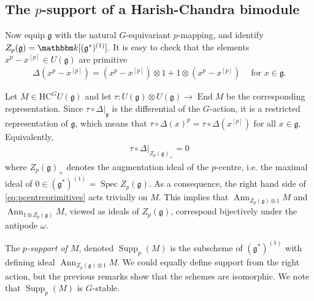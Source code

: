 \documentclass[twoside,12pt,reqno]{amsart}
\theoremstyle{remark}
\numberwithin{equation}{section}
\def\k{{\mathbbm k}}
\def\Ann{\operatorname{Ann}}
\def\Spec{\operatorname{Spec}}
\def\End{\operatorname{End}}
\def\Supp{\operatorname{Supp}}
\def\HC{\mathrm{HC}}
\def\g{{\mathfrak g}}
\begin{document}
\subsection{The $p$-support of a Harish-Chandra bimodule} 
\label{ss:psuppHCbimods}

Now equip $\g$ with the natural $G$-equivariant $p$-mapping, and identify $Z_p(\g) = \k[(\g^*)^{(1)}]$. It is easy to check that the elements $x^p - x^{[p]} \in U(\g)$ are primitive
\begin{eqnarray}
    \label{eq:pcentreprimitives}
    \Delta(x^p - x^{[p]}) = (x^p - x^{[p]}) \otimes 1 + 1\otimes (x^p - x^{[p]}) \ \ \ \ \text{ for } x\in \g.
\end{eqnarray}

Let $M \in \HC^G U(\g)$ and let $\tau : U(\g) \otimes U(\g) \to \End M$ be the corresponding representation. Since $\tau \circ \Delta|_\g$ is the differential of the $G$-action, it is a restricted representation of $\g$, which means that $\tau \circ \Delta(x)^p = \tau \circ\Delta(x^{[p]})$ for all $x\in \g$. Equivalently,
\begin{eqnarray}
    \label{eq:leftequalsrightpchar}
\tau \circ \Delta|_{Z_p(\g)_+} = 0    
\end{eqnarray}
where $Z_p(\g)_+$ denotes the augmentation ideal of the $p$-centre, i.e. the maximal ideal of $0 \in (\g^*)^{(1)} = \Spec Z_p(\g)$. As a consequence, the right hand side of \eqref{eq:pcentreprimitives} acts trivially on $M$. This implies that $\Ann_{Z_p(\g) \otimes 1} M$ and $\Ann_{1\otimes Z_p(\g)} M$, viewed as ideals of $Z_p(\g)$, correspond bijectively under the antipode $\omega$.

The {\it $p$-support of $M$}, denoted $\Supp_p(M)$ is the subscheme of $(\g^*)^{(1)}$ with defining ideal $\Ann_{Z_p(\g) \otimes 1} M$. We could equally define support from the right action, but the previous remarks show that the schemes are isomorphic. We note that $\Supp_p(M)$ is $G$-stable.
\end{document}
